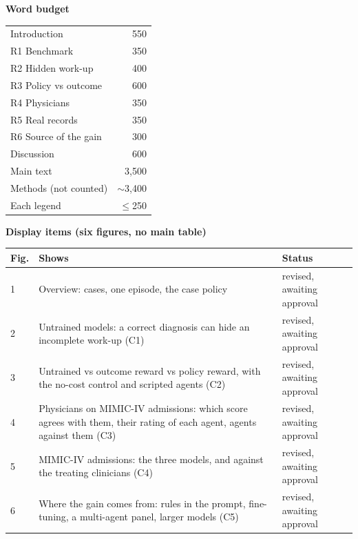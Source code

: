 \medskip
\noindent
\begin{minipage}[t]{0.37\textwidth}
\textbf{Word budget}\par\smallskip
{\small\begin{tabular}{@{}lr@{}}
\toprule
Introduction & 550 \\
R1 Benchmark & 350 \\
R2 Hidden work-up & 400 \\
R3 Policy vs outcome & 600 \\
R4 Physicians & 350 \\
R5 Real records & 350 \\
R6 Source of the gain & 300 \\
Discussion & 600 \\ \midrule
Main text & 3,500 \\
Methods (not counted) & $\sim$3,400 \\
Each legend & $\le$250 \\
\bottomrule
\end{tabular}}
\end{minipage}\hfill
\begin{minipage}[t]{0.59\textwidth}
\textbf{Display items (six figures, no main table)}\par\smallskip
{\small\begin{tabularx}{\linewidth}{@{}l>{\raggedright\arraybackslash}Xl@{}}
\toprule
Fig. & Shows & Status \\ \midrule
1 & Overview: cases, one episode, the case policy & revised, awaiting approval \\
2 & Untrained models: a correct diagnosis can hide an incomplete work-up (C1) & revised, awaiting approval \\
3 & Untrained vs outcome reward vs policy reward, with the no-cost control and scripted agents (C2) & revised, awaiting approval \\
4 & Physicians on MIMIC-IV admissions: which score agrees with them, their rating of each agent, agents against them (C3) & revised, awaiting approval \\
5 & MIMIC-IV admissions: the three models, and against the treating clinicians (C4) & revised, awaiting approval \\
6 & Where the gain comes from: rules in the prompt, fine-tuning, a multi-agent panel, larger models (C5) & revised, awaiting approval \\
\bottomrule
\end{tabularx}}
\end{minipage}

